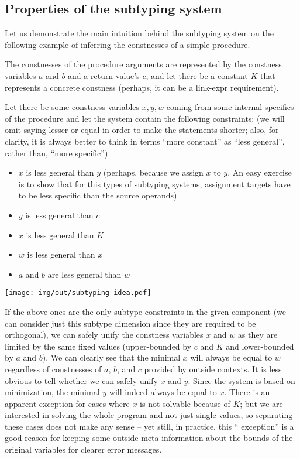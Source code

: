 \subsection{Properties of the subtyping system}
\label{subtyping-idea}

Let us demonstrate the main intuition behind the subtyping system on the following example of inferring the constnesses of a simple procedure.

The constnesses of the procedure arguments are represented by the constness variables $a$ and $b$ and a return value's $c$, and let there be a constant $K$ that represents a concrete constness (perhaps, it can be a link-expr requirement).

Let there be some constness variables $x, y, w$ coming from some internal specifics of the procedure and let the system contain the following constraints: (we will omit saying lesser-or-equal in order to make the statements shorter; also, for clarity, it is always better to think in terms ``more constant'' as ``less general'', rather than, ``more specific'')

\begin{itemize}
    \item $x$ is less general than $y$ (perhaps, because we assign $x$ to $y$. An easy exercise is to show that for this types of subtyping systems, assignment targets have to be less specific than the source operands)
    \item $y$ is less general than $c$
    \item $x$ is less general than $K$
    \item $w$ is less general than $x$
    \item $a$ and $b$ are less general than $w$
\end{itemize}

\centerline{\texttt{[image: img/out/subtyping-idea.pdf]}}

If the above ones are the only subtype constraints in the given component (we can consider just this subtype dimension since they are required to be orthogonal), we can safely unify the constness variables $x$ and $w$ as they are limited by the same fixed values (upper-bounded by $c$ and $K$ and lower-bounded by $a$ and $b$). We can clearly see that the minimal $x$ will always be equal to $w$ regardless of constnesses of $a$, $b$, and $c$ provided by outside contexts. It is less obvious to tell whether we can safely unify $x$ and $y$. Since the system is based on minimization, the minimal $y$ will indeed always be equal to $x$. There is an apparent exception for cases where $x$ is not solvable because of $K$; but we are interested in solving the whole program and not just single values, so separating these cases does not make any sense -- yet still, in practice, this `` exception'' is a good reason for keeping some outside meta-information about the bounds of the original variables for clearer error messages.

